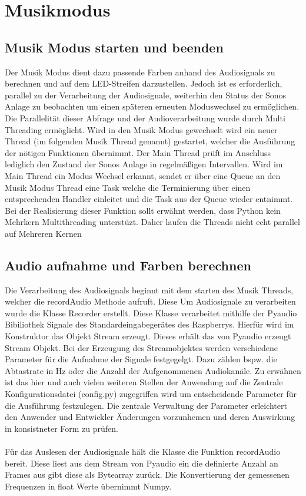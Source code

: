 \section{Musikmodus}
\subsection{Musik Modus starten und beenden}
Der Musik Modus dient dazu passende Farben anhand des Audiosignals zu berechnen und auf dem LED-Streifen darzustellen. Jedoch ist es erforderlich, parallel zu der Verarbeitung
der Audiosignale, weiterhin den Status der Sonos Anlage zu beobachten um einen späteren erneuten Moduswechsel zu ermöglichen. Die Parallelität dieser Abfrage und der 
Audioverarbeitung wurde durch Multi Threading ermöglicht. Wird in den Musik Modus gewechselt wird ein neuer Thread (im folgenden Musik Thread genannt) gestartet,
welcher die Ausführung der nötigen Funktionen übernimmt. Der Main Thread prüft im Anschluss lediglich den Zustand der Sonos Anlage in regelmäßigen Intervallen. 
Wird im Main Thread ein Modus Wechsel erkannt, sendet er über eine Queue an den Musik Modus Thread eine Task welche die Terminierung über einen entsprechenden Handler
einleitet und die Task aus der Queue wieder entnimmt. Bei der Realisierung dieser Funktion sollt erwähnt werden, dass Python kein Mehrkern Multithreading unterstüzt. Daher
laufen die Threads nicht echt parallel auf Mehreren Kernen

\subsection{Audio aufnahme und Farben berechnen}
Die Verarbeitung des Audiosignals beginnt mit dem starten des Musik Threads, welcher die recordAudio Methode aufruft. Diese 
Um Audiosignale zu verarbeiten wurde die Klasse Recorder erstellt. Diese Klasse verarbeitet mithilfe der Pyaudio Bibiliothek Signale des Standardeingabegerätes des Raspberrys.
Hierfür wird im Konstruktor das Objekt Stream erzeugt. Dieses erhält das von Pyaudio erzeugt Stream Objekt. Bei der Erzeugung des Streamobjektes werden verschiedene Parameter 
für die Aufnahme der Signale festgegelgt. Dazu zählen bspw. die Abtastrate in Hz oder die Anzahl der Aufgenommenen Audiokanäle. Zu erwähnen ist das hier und auch vielen 
weiteren Stellen der Anwendung auf die Zentrale Konfigurationsdatei (config.py) zugegriffen wird um entscheidende Parameter für die Ausführung festzulegen. Die zentrale 
Verwaltung der Parameter erleichtert den Anwender und Entwickler Änderungen vorzunhemen und deren Auswirkung in konsistneter Form zu prüfen. \\\\
Für das Auslesen der Audiosignale hält die Klasse die Funktion recordAudio bereit. Diese liest aus dem Stream von Pyaudio ein die definierte Anzahl an Frames aus gibt diese als
Bytearray zurück. Die Konvertierung der gemessenen Frequenzen in float Werte übernimmt Numpy. 




